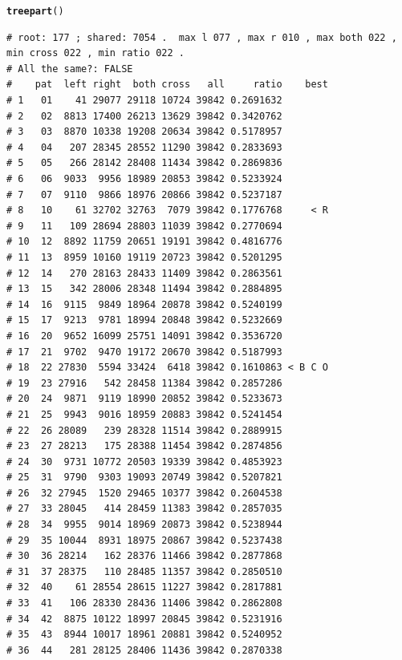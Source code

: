 \documentclass{article}\usepackage[]{graphicx}\usepackage[]{color}
\makeatletter
\newcommand{\hlstd}[1]{\textcolor[rgb]{0.345,0.345,0.345}{#1}}%
\newcommand{\hlkwd}[1]{\textcolor[rgb]{0.737,0.353,0.396}{\textbf{#1}}}%
\newenvironment{kframe}{%
 \def\at@end@of@kframe{}%
 \ifinner\ifhmode%
  \def\at@end@of@kframe{\end{minipage}}%
  \begin{minipage}{\columnwidth}%
 \fi\fi%
 \def\FrameCommand##1{\hskip\@totalleftmargin \hskip-\fboxsep
 \colorbox{shadecolor}{##1}\hskip-\fboxsep
     \hskip-\linewidth \hskip-\@totalleftmargin \hskip\columnwidth}%
 \MakeFramed {\advance\hsize-\width
   \@totalleftmargin\z@ \linewidth\hsize
   \@setminipage}}%
 {\par\unskip\endMakeFramed%
 \at@end@of@kframe}
\newenvironment{knitrout}{}{} %
\makeatother
\begin{document}
\begin{knitrout}\footnotesize
{}\color{fgcolor}\begin{kframe}
\begin{alltt}
\hlkwd{treepart}\hlstd{()}
\end{alltt}
\begin{verbatim}
# root: 177 ; shared: 7054 .  max l 077 , max r 010 , max both 022 , min cross 022 , min ratio 022 . 
# All the same?: FALSE
#    pat  left right  both cross   all     ratio    best
# 1   01    41 29077 29118 10724 39842 0.2691632        
# 2   02  8813 17400 26213 13629 39842 0.3420762        
# 3   03  8870 10338 19208 20634 39842 0.5178957        
# 4   04   207 28345 28552 11290 39842 0.2833693        
# 5   05   266 28142 28408 11434 39842 0.2869836        
# 6   06  9033  9956 18989 20853 39842 0.5233924        
# 7   07  9110  9866 18976 20866 39842 0.5237187        
# 8   10    61 32702 32763  7079 39842 0.1776768     < R
# 9   11   109 28694 28803 11039 39842 0.2770694        
# 10  12  8892 11759 20651 19191 39842 0.4816776        
# 11  13  8959 10160 19119 20723 39842 0.5201295        
# 12  14   270 28163 28433 11409 39842 0.2863561        
# 13  15   342 28006 28348 11494 39842 0.2884895        
# 14  16  9115  9849 18964 20878 39842 0.5240199        
# 15  17  9213  9781 18994 20848 39842 0.5232669        
# 16  20  9652 16099 25751 14091 39842 0.3536720        
# 17  21  9702  9470 19172 20670 39842 0.5187993        
# 18  22 27830  5594 33424  6418 39842 0.1610863 < B C O
# 19  23 27916   542 28458 11384 39842 0.2857286        
# 20  24  9871  9119 18990 20852 39842 0.5233673        
# 21  25  9943  9016 18959 20883 39842 0.5241454        
# 22  26 28089   239 28328 11514 39842 0.2889915        
# 23  27 28213   175 28388 11454 39842 0.2874856        
# 24  30  9731 10772 20503 19339 39842 0.4853923        
# 25  31  9790  9303 19093 20749 39842 0.5207821        
# 26  32 27945  1520 29465 10377 39842 0.2604538        
# 27  33 28045   414 28459 11383 39842 0.2857035        
# 28  34  9955  9014 18969 20873 39842 0.5238944        
# 29  35 10044  8931 18975 20867 39842 0.5237438        
# 30  36 28214   162 28376 11466 39842 0.2877868        
# 31  37 28375   110 28485 11357 39842 0.2850510        
# 32  40    61 28554 28615 11227 39842 0.2817881        
# 33  41   106 28330 28436 11406 39842 0.2862808        
# 34  42  8875 10122 18997 20845 39842 0.5231916        
# 35  43  8944 10017 18961 20881 39842 0.5240952        
# 36  44   281 28125 28406 11436 39842 0.2870338        

\end{verbatim}
\end{kframe}
\end{knitrout}
\end{document}
